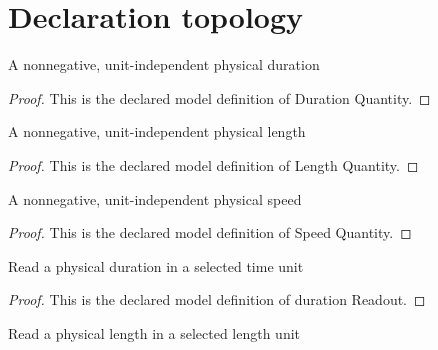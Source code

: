 \section{Declaration topology}
\begin{definition}
  \label{def:physics:phyx-mini-0593:phyxminiproblems-problemphyxmini0593-durationquantity}
  A nonnegative, unit-independent physical duration
\end{definition}
\begin{proof}
  This is the declared model definition of Duration Quantity.
\end{proof}
\begin{definition}
  \label{def:physics:phyx-mini-0593:phyxminiproblems-problemphyxmini0593-lengthquantity}
  A nonnegative, unit-independent physical length
\end{definition}
\begin{proof}
  This is the declared model definition of Length Quantity.
\end{proof}
\begin{definition}
  \label{def:physics:phyx-mini-0593:phyxminiproblems-problemphyxmini0593-speedquantity}
  A nonnegative, unit-independent physical speed
\end{definition}
\begin{proof}
  This is the declared model definition of Speed Quantity.
\end{proof}
\begin{definition}
  \label{def:physics:phyx-mini-0593:phyxminiproblems-problemphyxmini0593-durationreadout}
  Read a physical duration in a selected time unit
\end{definition}
\begin{proof}
  This is the declared model definition of duration Readout.
\end{proof}
\begin{definition}
  \label{def:physics:phyx-mini-0593:phyxminiproblems-problemphyxmini0593-lengthreadout}
  Read a physical length in a selected length unit
\end{definition}
